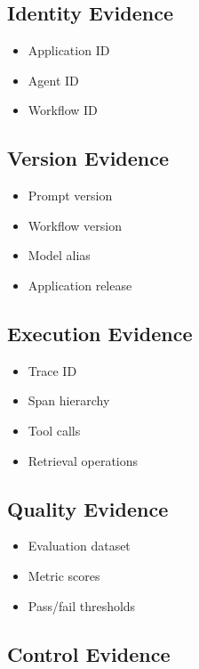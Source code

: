 \documentclass[11pt,a4paper]{article}
\begin{document}
\subsection{Identity Evidence}

\begin{itemize}
\item Application ID
\item Agent ID
\item Workflow ID
\end{itemize}

\subsection{Version Evidence}

\begin{itemize}
\item Prompt version
\item Workflow version
\item Model alias
\item Application release
\end{itemize}

\subsection{Execution Evidence}

\begin{itemize}
\item Trace ID
\item Span hierarchy
\item Tool calls
\item Retrieval operations
\end{itemize}

\subsection{Quality Evidence}

\begin{itemize}
\item Evaluation dataset
\item Metric scores
\item Pass/fail thresholds
\end{itemize}

\subsection{Control Evidence}
\end{document}
